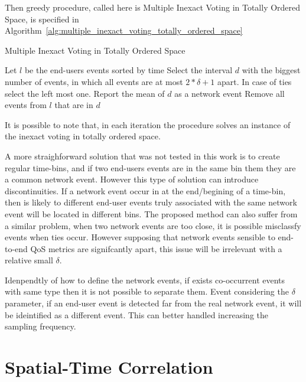 Then greedy procedure, called here is Multiple Inexact Voting in Totally
Ordered Space, is specified in
Algorithm~\ref{alg:multiple_inexact_voting_totally_ordered_space}

\begin{algorithm}[H]
\caption{Multiple Inexact Voting in Totally Ordered Space}
\label{alg:multiple_inexact_voting_totally_ordered_space}
    \begin{algorithmic}[1]
        \State{} Let $l$ be the end-users events sorted by time
            \State{} Select the interval $d$ with the biggest number of events,
            in which all events are at most $2 * \delta + 1$ apart.
            In case of ties select the left most one. Report the mean of $d$ as
            a network event
            \State{} Remove all events from $l$ that are in $d$
        \EndWhile{}
    \end{algorithmic}
\end{algorithm}

It is possible to note that, in each iteration the procedure solves an instance
of the inexact voting in totally ordered space.

A more straighforward solution that was not tested in this work is to create
regular time-bins, and if two end-users events are in the same bin them they
are a common network event. However this type of solution can introduce
discontinuities. If a network event occur in at the end/begining of a time-bin,
then is likely to different end-user events truly associated with the same
network event will be located in different bins. The proposed method can also
suffer from a similar problem, when two network events are too close, it is
possible misclassfy events when ties occur.
However supposing
that network events sensible to end-to-end QoS metrics are signifcantly apart,
this issue will be irrelevant with a relative small $\delta$.

Idenpendtly of how to define the network events, if exists co-occurrent events
with same type then it is not possible to separate them. Event considering the
$\delta$ parameter, if an end-user event is detected far from the real network
event, it will be ideintified as a different event. This can better handled
increasing the sampling frequency.

\section{Spatial-Time Correlation}
\label{sec:spatial_time_correlation}

